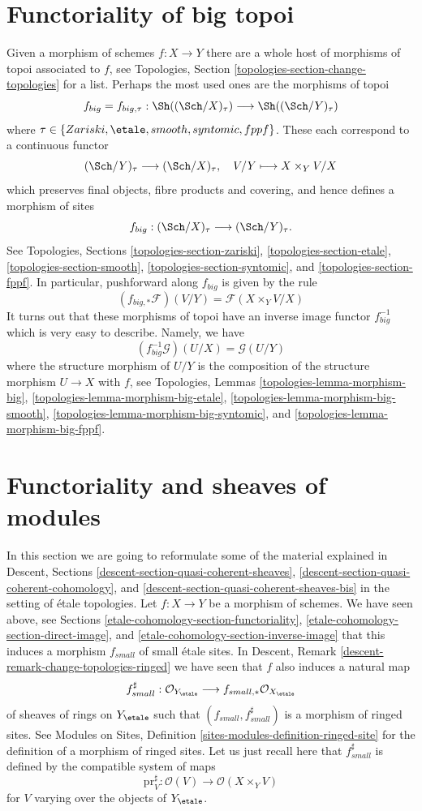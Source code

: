 \section{Functoriality of big topoi}
\label{etale-cohomology-section-functoriality-big-topoi}
Given a morphism of schemes $f : X \to Y$ there are a whole host of
morphisms of topoi associated to $f$, see
Topologies, Section \ref{topologies-section-change-topologies}
for a list. Perhaps the most used ones are the morphisms of topoi
$$
f_{big} = f_{big, \tau} :
\Sh((\Sch/X)_\tau)
\longrightarrow
\Sh((\Sch/Y)_\tau)
$$
where $\tau \in \{Zariski, \etale, smooth, syntomic, fppf\}$.
These each correspond to a continuous functor
$$
(\Sch/Y)_\tau \longrightarrow (\Sch/X)_\tau, \quad
V/Y \longmapsto X \times_Y V/X
$$
which preserves final objects, fibre products and covering, and hence
defines a morphism of sites
$$
f_{big} : (\Sch/X)_\tau \longrightarrow (\Sch/Y)_\tau.
$$
See
Topologies, Sections \ref{topologies-section-zariski},
\ref{topologies-section-etale},
\ref{topologies-section-smooth},
\ref{topologies-section-syntomic}, and
\ref{topologies-section-fppf}.
In particular, pushforward along $f_{big}$ is given by the rule
$$
(f_{big, *}\mathcal{F})(V/Y) = \mathcal{F}(X \times_Y V/X)
$$
It turns out that these morphisms of topoi have an inverse
image functor $f_{big}^{-1}$ which is very easy to describe.
Namely, we have
$$
(f_{big}^{-1}\mathcal{G})(U/X) = \mathcal{G}(U/Y)
$$
where the structure morphism of $U/Y$ is the composition of the
structure morphism $U \to X$ with $f$, see
Topologies, Lemmas \ref{topologies-lemma-morphism-big},
\ref{topologies-lemma-morphism-big-etale},
\ref{topologies-lemma-morphism-big-smooth},
\ref{topologies-lemma-morphism-big-syntomic}, and
\ref{topologies-lemma-morphism-big-fppf}.

\section{Functoriality and sheaves of modules}
\label{etale-cohomology-section-morphisms-modules}
In this section we are going to reformulate some of the material explained in
Descent, Sections \ref{descent-section-quasi-coherent-sheaves},
\ref{descent-section-quasi-coherent-cohomology}, and
\ref{descent-section-quasi-coherent-sheaves-bis}
in the setting of \'etale topologies. Let $f : X \to Y$ be a morphism of
schemes. We have seen above, see
Sections \ref{etale-cohomology-section-functoriality}, \ref{etale-cohomology-section-direct-image}, and
\ref{etale-cohomology-section-inverse-image}
that this induces a morphism $f_{small}$ of small \'etale sites. In
Descent, Remark \ref{descent-remark-change-topologies-ringed}
we have seen that $f$ also induces a natural map
$$
f_{small}^\sharp :
\mathcal{O}_{Y_\etale}
\longrightarrow
f_{small, *}\mathcal{O}_{X_\etale}
$$
of sheaves of rings on
$Y_\etale$ such that $(f_{small}, f_{small}^\sharp)$
is a morphism of ringed sites. See
Modules on Sites, Definition \ref{sites-modules-definition-ringed-site}
for the definition of a morphism of ringed sites.
Let us just recall here that $f_{small}^\sharp$ is defined by the
compatible system of maps
$$
\text{pr}_V^\sharp : \mathcal{O}(V) \longrightarrow \mathcal{O}(X \times_Y V)
$$
for $V$ varying over the objects of $Y_\etale$.

